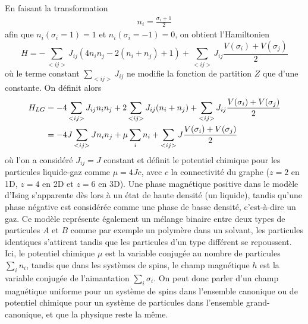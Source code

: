 En faisant la transformation\cite{goldenfeld_lectures_2018} 
\begin{align}
    n_i =  \frac{\sigma_i +1}{2}
\end{align}
afin que $n_i(\sigma_i = 1) = 1$ et $n_i(\sigma_i = -1) = 0$, on obtient l'Hamiltonien
\begin{equation}
	H =  - \sum_{< i j >}  J_{ij} \left( 4 n_i n_j -2 ( n_i+n_j) + 1 \right)+ \sum_{< i j >}  J_{ij} \frac{V(\sigma_i)+V(\sigma_j)}{2}  
\end{equation}
où le terme constant $\sum_{< i j >}  J_{ij}$ ne modifie la fonction de partition $Z$ que d'une constante. On définit alors 
\begin{align}
	H_{LG} &=  - 4 \sum_{< i j >}  J_{ij}  n_i n_j  + 2 \sum_{< i j >}  J_{ij}  (n_i+n_j) + \sum_{< i j >}  J_{ij} \frac{V(\sigma_i)+V(\sigma_j)}{2}  \nonumber \\
       &=  - 4 J \sum_{< i j >}  J n_i n_j  + \mu \sum_i  n_i + \sum_{< i j >}  J \frac{V(\sigma_i)+V(\sigma_j)}{2}  
\end{align}
où l'on a considéré $J_{ij} = J$ constant et définit le potentiel chimique pour les particules liquide-gaz comme $\mu=4Jc$, avec $c$ la connectivité du graphe ($z=2$ en 1D, $z=4$ en 2D et $z=6$ en 3D). Une phase magnétique positive dans le modèle d'Ising s'apparente dès lors à un état de haute densité (un liquide), tandis qu'une phase négative est considérée comme une phase de basse densité, c'est-à-dire un gaz.
Ce modèle représente également un mélange binaire entre deux types de particules $A$ et $B$ comme par exemple un polymère dans un solvant, les particules identiques s'attirent tandis que les particules d'un type différent se repoussent. 
Ici, le potentiel chimique $\mu$ est la variable conjugée au nombre de particules $\sum_i n_i$, tandis que dans les systèmes de spins, le champ magnétique $h$ est la variable conjugée de l'aimantation $\sum_i \sigma_i$.
On peut donc parler d'un champ magnétique uniforme pour un système de spins dans l'ensemble canonique ou de potentiel chimique pour un système de particules dans l'ensemble grand-canonique, et que la physique reste la même. 

